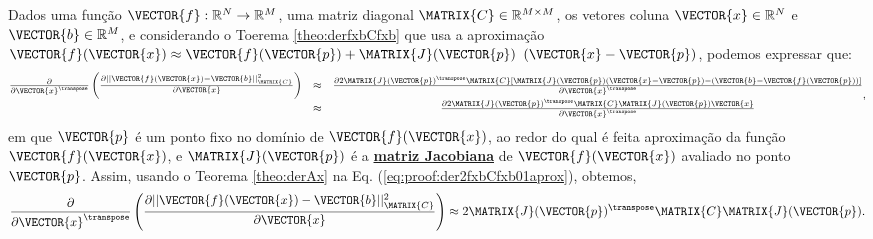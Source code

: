 \begin{myproofT}\label{proof:theo:der2fxbCfxb0aprox}
Dados
uma função $\VECTOR{f}:\mathbb{R}^{N} \rightarrow \mathbb{R}^{M}$, 
uma matriz diagonal $\MATRIX{C}\in \mathbb{R}^{M\times M}$, 
os vetores coluna $\VECTOR{x}\in \mathbb{R}^{N}$ e 
$\VECTOR{b}\in \mathbb{R}^{M}$, e
considerando o Toerema \ref{theo:derfxbCfxb} que usa a aproximação
$\VECTOR{f}(\VECTOR{x})\approx \VECTOR{f}(\VECTOR{p}) + \MATRIX{J}(\VECTOR{p})$ $\left(\VECTOR{x}-\VECTOR{p}\right)$,
podemos expressar que:
\begin{equation}\label{eq:proof:der2fxbCfxb01aprox}
\begin{matrix}
\frac{\partial }{\partial \VECTOR{x}^{\transpose}}\left( \frac{\partial ||\VECTOR{f}(\VECTOR{x})-\VECTOR{b}||_{\MATRIX{C}}^2}{\partial \VECTOR{x}} \right) & \approx & 
\frac{\partial 2 \MATRIX{J}(\VECTOR{p})^{\transpose}\MATRIX{C}\left[\MATRIX{J}(\VECTOR{p})\left(\VECTOR{x} - \VECTOR{p}\right)-\left(\VECTOR{b}-\VECTOR{f}(\VECTOR{p})\right)\right]}{\partial \VECTOR{x}^{\transpose}} \\
~ & \approx & \frac{\partial 2 \MATRIX{J}(\VECTOR{p})^{\transpose}\MATRIX{C} \MATRIX{J}(\VECTOR{p})\VECTOR{x}  }{\partial \VECTOR{x}^{\transpose}}
\end{matrix},
\end{equation}
em que $\VECTOR{p}$ é um ponto fixo no domínio de $\VECTOR{f}(\VECTOR{x})$, 
ao redor do qual é feita  aproximação
da função $\VECTOR{f}(\VECTOR{x})$,
e $\MATRIX{J}(\VECTOR{p})$ é a \hyperref[def:jacobian]{\textbf{matriz Jacobiana}} 
de $\VECTOR{f}(\VECTOR{x})$ avaliado no ponto $\VECTOR{p}$.
Assim, usando o Teorema \ref{theo:derAx} na Eq. (\ref{eq:proof:der2fxbCfxb01aprox}),
obtemos,
\begin{equation}\label{eq:proof:der2fxbCfxb01aprox2}
\frac{\partial }{\partial \VECTOR{x}^{\transpose}}\left( \frac{\partial ||\VECTOR{f}(\VECTOR{x})-\VECTOR{b}||_{\MATRIX{C}}^2}{\partial \VECTOR{x}} \right) \approx 
2 \MATRIX{J}(\VECTOR{p})^{\transpose}\MATRIX{C} \MATRIX{J}(\VECTOR{p}).
\end{equation}
\end{myproofT}

